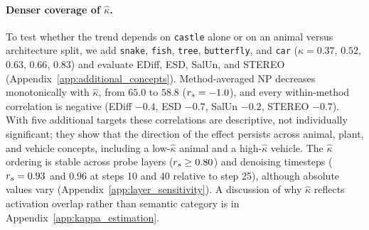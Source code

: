 \paragraph{Denser coverage of $\hat\kappa$.} To test whether the trend depends on \texttt{castle} alone or on an animal versus architecture split, we add \texttt{snake}, \texttt{fish}, \texttt{tree}, \texttt{butterfly}, and \texttt{car} ($\hat\kappa=0.37$, $0.52$, $0.63$, $0.66$, $0.83$) and evaluate EDiff, ESD, SalUn, and STEREO (Appendix~\ref{app:additional_concepts}). Method-averaged NP decreases monotonically with $\hat\kappa$, from $65.0$ to $58.8$ ($r_s=-1.0$), and every within-method correlation is negative (EDiff $-0.4$, ESD $-0.7$, SalUn $-0.2$, STEREO $-0.7$). With five additional targets these correlations are descriptive, not individually significant; they show that the direction of the effect persists across animal, plant, and vehicle concepts, including a low-$\hat\kappa$ animal and a high-$\hat\kappa$ vehicle. The $\hat\kappa$ ordering is stable across probe layers ($r_s\geq0.80$) and denoising timesteps ($r_s=0.93$ and $0.96$ at steps 10 and 40 relative to step 25), although absolute values vary (Appendix~\ref{app:layer_sensitivity}). A discussion of why $\hat\kappa$ reflects activation overlap rather than semantic category is in Appendix~\ref{app:kappa_estimation}.

